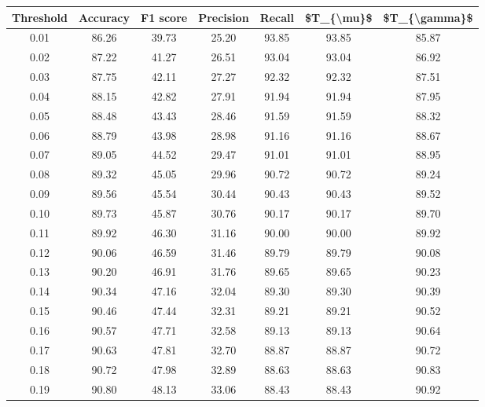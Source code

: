 \begin{tabular}{|c|c|c|c|c|c|c|}
\hline
 Threshold &  Accuracy &  F1 score &  Precision &  Recall &  \$T\_\{\textbackslash mu\}\$ &  \$T\_\{\textbackslash gamma\}\$ \\
\hline
      0.01 &     86.26 &     39.73 &      25.20 &   93.85 &      93.85 &         85.87 \\
      0.02 &     87.22 &     41.27 &      26.51 &   93.04 &      93.04 &         86.92 \\
      0.03 &     87.75 &     42.11 &      27.27 &   92.32 &      92.32 &         87.51 \\
      0.04 &     88.15 &     42.82 &      27.91 &   91.94 &      91.94 &         87.95 \\
      0.05 &     88.48 &     43.43 &      28.46 &   91.59 &      91.59 &         88.32 \\
      0.06 &     88.79 &     43.98 &      28.98 &   91.16 &      91.16 &         88.67 \\
      0.07 &     89.05 &     44.52 &      29.47 &   91.01 &      91.01 &         88.95 \\
      0.08 &     89.32 &     45.05 &      29.96 &   90.72 &      90.72 &         89.24 \\
      0.09 &     89.56 &     45.54 &      30.44 &   90.43 &      90.43 &         89.52 \\
      0.10 &     89.73 &     45.87 &      30.76 &   90.17 &      90.17 &         89.70 \\
      0.11 &     89.92 &     46.30 &      31.16 &   90.00 &      90.00 &         89.92 \\
      0.12 &     90.06 &     46.59 &      31.46 &   89.79 &      89.79 &         90.08 \\
      0.13 &     90.20 &     46.91 &      31.76 &   89.65 &      89.65 &         90.23 \\
      0.14 &     90.34 &     47.16 &      32.04 &   89.30 &      89.30 &         90.39 \\
      0.15 &     90.46 &     47.44 &      32.31 &   89.21 &      89.21 &         90.52 \\
      0.16 &     90.57 &     47.71 &      32.58 &   89.13 &      89.13 &         90.64 \\
      0.17 &     90.63 &     47.81 &      32.70 &   88.87 &      88.87 &         90.72 \\
      0.18 &     90.72 &     47.98 &      32.89 &   88.63 &      88.63 &         90.83 \\
      0.19 &     90.80 &     48.13 &      33.06 &   88.43 &      88.43 &         90.92 \\

\end{tabular}
